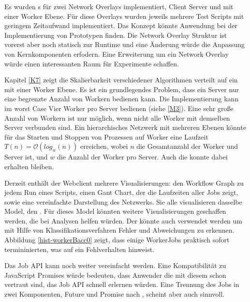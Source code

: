 Es wurden \jobScript s für zwei Network Overlays implementiert, Client Server und \hcsno{} mit einer Worker Ebene.
Für diese Overlays wurden jeweils mehrere Test Scripts mit geringem Zeitaufwand  implementiert.
Das Konzept könnte Anwendung bei der Implementierung von Prototypen finden.
Die Network Overlay Struktur ist vorerst aber noch statisch zur Runtime und eine Änderung würde die Anpassung von Kernkomponenten erfodern.
Eine Erweiterung um ein \ptp{} Network Overlay würde einen interessanten Raum für Experimente schaffen.


Kapitel \ref{K7} zeigt die Skalierbarkeit verschiedener Algorithmen verteilt auf ein \hcsno{} mit einer Worker Ebene.
Es ist ein grundlegendes Problem, dass ein Server nur eine begrenzte Anzahl von Workern bedienen kann.
Die \JavaScript{} Implementierung kann im worst Case Vier Worker pro Server bedienen (siehe \ref{M3}).
Eine sehr große Anzahl von Workern ist nur möglich, wenn nicht alle Worker mit demselben Server verbunden sind.
Ein hierarchisches Netzwerk mit mehreren Ebenen könnte für das Starten und Stoppen von Prozessen auf Worker eine Laufzeit  $T(n) = \mathcal{O}(log_{w}(n))$ erreichen, wobei $n$ die Gesamtanzahl der Worker und Server ist, und $w$ die Anzahl der Worker pro Server.
Auch die \ProgressAnzeige{} konnte dabei erhalten bleiben.


Derzeit enthält der Webclient mehrere Visualisierungen:
den Workflow Graph zu jedem Run eines Scripts, einen Gant Chart, der die Laufzeiten aller Jobs zeigt, sowie eine vereinfachte Darstellung des Netzwerks.
Sie alle visualisieren dasselbe Model, den \JobTree{}.
Für dieses Model könnten weitere Visualisierungen geschaffen werden, die bei Analysen helfen würden.
Der \JobTree{} könnte auch verwendet werden um mit Hilfe von Klassifikationsverfahren Fehler und Abweichungen zu erkennen.
Abbildung \ref{hist-workerBacc0} zeigt, dass einige WorkerJobs praktisch sofort termininierten, was auf ein Fehlverhalten hinweist.


Das Job API kann noch weiter vereinfacht werden.
Eine Kompatibilität zu JavaScript Promises würde bedeuten, dass Anwender die mit diesem schon vertraut sind, das Job API schnell erlernen würden.
Eine Trennung des Jobs in zwei Komponenten, Future und Promise nach \cite{baker1977incremental}, scheint aber auch sinnvoll.



